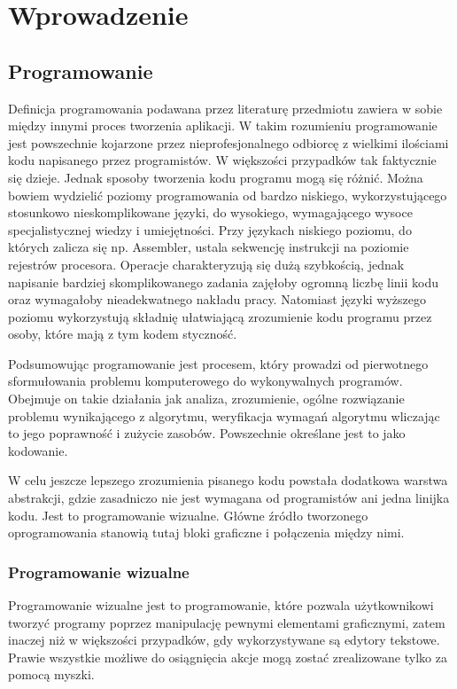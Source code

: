 \chapter{Wprowadzenie}
\label{c1}

\section{Programowanie}
\label{c11}

Definicja programowania podawana przez literaturę przedmiotu zawiera w sobie między innymi proces tworzenia aplikacji. W takim rozumieniu programowanie jest powszechnie kojarzone przez nieprofesjonalnego odbiorcę  z wielkimi ilościami kodu napisanego przez programistów. W większości przypadków tak faktycznie się dzieje. Jednak sposoby tworzenia kodu programu mogą się różnić. Można bowiem wydzielić poziomy programowania od bardzo niskiego, wykorzystującego stosunkowo nieskomplikowane języki, do wysokiego, wymagającego wysoce specjalistycznej wiedzy i umiejętności. Przy językach niskiego poziomu, do których zalicza się np. Assembler, ustala sekwencję instrukcji na poziomie rejestrów procesora. Operacje charakteryzują się dużą szybkością, jednak napisanie bardziej skomplikowanego zadania zajęłoby ogromną liczbę linii kodu oraz wymagałoby nieadekwatnego nakładu pracy. Natomiast języki wyższego poziomu wykorzystują składnię ułatwiającą zrozumienie kodu programu przez osoby, które mają z tym kodem styczność. 

Podsumowując programowanie jest procesem, który prowadzi od pierwotnego sformułowania problemu komputerowego do wykonywalnych programów. Obejmuje on takie działania jak analiza, zrozumienie, ogólne rozwiązanie problemu wynikającego z algorytmu, weryfikacja wymagań algorytmu wliczając to jego poprawność i zużycie zasobów. Powszechnie określane jest to jako kodowanie.\cite{android:64}\cite{android:65}

W celu jeszcze lepszego zrozumienia pisanego kodu powstała dodatkowa warstwa abstrakcji, gdzie zasadniczo nie jest wymagana od programistów ani jedna linijka kodu. Jest to programowanie wizualne. Główne źródło tworzonego oprogramowania stanowią tutaj bloki graficzne i połączenia między nimi. 


\subsection{Programowanie wizualne}
\label{c111}


Programowanie wizualne jest to programowanie, które pozwala użytkownikowi tworzyć programy poprzez manipulację pewnymi elementami graficznymi, zatem inaczej niż w większości przypadków, gdy wykorzystywane są edytory tekstowe. Prawie wszystkie możliwe do osiągnięcia akcje mogą zostać zrealizowane tylko za pomocą myszki. 

